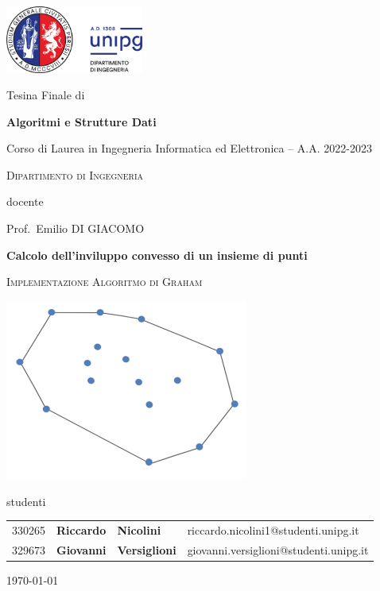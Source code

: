 \documentclass[12pt,a4paper]{report}
\begin{document}
\begin{titlepage}

	\centering
	\includegraphics[width=0.34\textwidth]{logo-unipg}\par\vspace{1cm}
	\large{Tesina Finale di}\par
	\large{\textbf{Algoritmi e Strutture Dati}}\par
	\small{Corso di Laurea in Ingegneria Informatica ed Elettronica -- A.A. 2022-2023}\par
	\textsc{\small{Dipartimento di Ingegneria}}\par

	\vspace{0.5cm}
	docente\par
	Prof.~Emilio \textsc{DI GIACOMO}

	\vspace{2cm}
	\textbf{\huge{Calcolo dell'inviluppo convesso di un insieme di punti}}\par
	\vspace{0.2cm}
	  \textsc{Implementazione Algoritmo di Graham}\par
	
	\vspace{1.5cm}
	\includegraphics[width=0.6\textwidth]{CH.png}\par
 
	\vspace{1cm}
	\large{studenti}\par
	\vspace{0.5cm}
	\begin{tabular}{ l l l l }
	\large{330265} & \large{\textbf{Riccardo}} & \large{\textbf{Nicolini}} &        \large{riccardo.nicolini1@studenti.unipg.it}\\
	\large{329673} & \large{\textbf{Giovanni}} & \large{\textbf{Versiglioni}} &     \large{giovanni.versiglioni@studenti.unipg.it}\\
	\end{tabular}

    \vfill
    \raggedright
    \vspace{0.5cm}
    \small{\today}
\end{titlepage}
\restoregeometry
\end{document}
